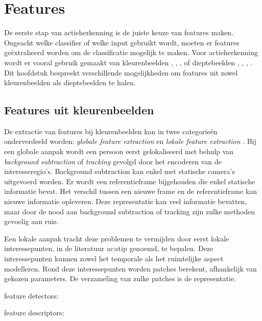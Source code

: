 %

\chapter{Features}
\label{ch:features}
De eerste stap van actieherkenning is de juiste keuze van features maken. Ongeacht welke classifier of welke input gebruikt wordt, moeten er features geëxtraheerd worden om de classificatie mogelijk te maken. Voor actieherkenning wordt er vooral gebruik gemaakt van kleurenbeelden \cite{Laptev2008}, \cite{Dollar2005}, \cite{Willems2008}, \cite{Wang2011} of dieptebeelden \cite{Li2010}, \cite{Wang2012a}, \cite{Xia2012}, \cite{Gu2010}. Dit hoofdstuk bespreekt verschillende mogelijkheden om features uit zowel kleurenbeelden als dieptebeelden te halen. 

\section{Features uit kleurenbeelden}
De extractie van features bij kleurenbeelden kan in twee categorieën onderverdeeld worden: \textit{globale feature extraction} en \textit{lokale feature extraction} \cite{Poppe2010}. Bij een globale aanpak wordt een persoon eerst gelokaliseerd met behulp van \textit{background subtraction} of \textit{tracking} gevolgd door het encoderen van de interesseregio's. Background subtraction kan enkel met statische camera's uitgevoerd worden. Er wordt een referentieframe bijgehouden die enkel statische informatie bevat. Het verschil tussen een nieuwe frame en de referentieframe kan nieuwe informatie opleveren. Deze representatie kan veel informatie bevatten, maar door de nood aan background subtraction of tracking zijn zulke methoden gevoelig aan ruis.

Een lokale aanpak tracht deze problemen te vermijden door eerst lokale interessepunten, in de literatuur \gls{ac:stip} genoemd, te bepalen. Deze interessepunten kunnen zowel het temporale als het ruimtelijke aspect modelleren. Rond deze interessepunten worden patches berekent, afhankelijk van gekozen parameters. De verzameling van zulke patches is de representatie. 
 
feature detectors:

feature descriptors:
 
